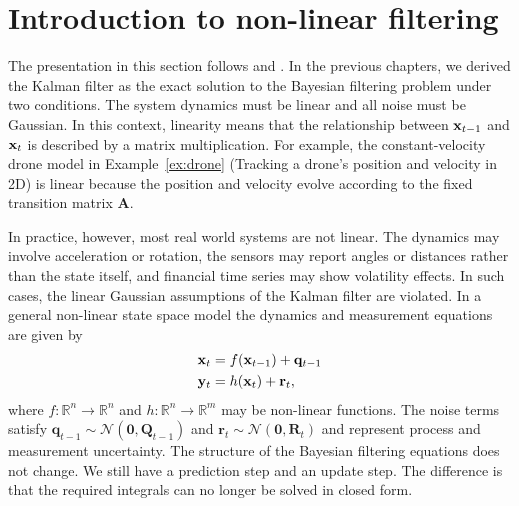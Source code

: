 \section{Introduction to non-linear filtering}
The presentation in this section follows \cite[Ch.~2 and Ch.~5]{sarkka:bayesian_filtering} and \cite[Ch.~8 to Ch.~11]{labbe:kalman_and_bayesian_filters}. In the previous chapters, we derived the Kalman filter as the exact solution to the Bayesian filtering problem under two conditions. The system dynamics must be linear and all noise must be Gaussian. In this context, linearity means that the relationship between $\mathbf{x}_{t-1}$ and $\mathbf{x}_{t}$ is described by a matrix multiplication. For example, the constant-velocity drone model in Example~\ref{ex:drone} (Tracking a drone's position and velocity in 2D) is linear because the position and velocity evolve according to the fixed transition matrix $\mathbf{A}$.

In practice, however, most real world systems are not linear. The dynamics may involve acceleration or rotation, the sensors may report angles or distances rather than the state itself, and financial time series may show volatility effects. In such cases, the linear Gaussian assumptions of the Kalman filter are violated. 
In a general non-linear state space model the dynamics and measurement equations are given by 
\begin{equation}\label{eq: nonlinear ssm}
    \begin{aligned}
        \mathbf{x}_t &= f(\mathbf{x}_{t-1}) + \mathbf{q}_{t-1} \\
        \mathbf{y}_t &= h(\mathbf{x}_t)+\mathbf{r}_t,
    \end{aligned}
\end{equation}
where $f: \mathbb{R}^n \rightarrow \mathbb{R}^n$ and $h: \mathbb{R}^n \rightarrow \mathbb{R}^m$ may be non-linear functions. The noise terms satisfy $\mathbf{q}_{t-1} \sim \mathcal{N}(\mathbf{0}, \mathbf{Q}_{t-1})$ and $\mathbf{r}_t \sim \mathcal{N}(\mathbf{0}, \mathbf{R}_t)$ and represent process and measurement uncertainty. 
The structure of the Bayesian filtering equations does not change. We still have a prediction step and an update step. The difference is that the required integrals can no longer be solved in closed form.


